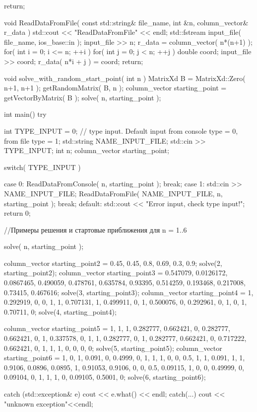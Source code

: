 \documentclass[12pt, a4paper]{extarticle}
\begin{document}
\begin{listing}[1]{1}
{	return;
}

void ReadDataFromFile( const std::string& file_name,
int &n,
column_vector& r_data )
{
	std::cout << "ReadDataFromFile" << endl;
	std::fstream input_file( file_name, ios_base::in );
	input_file >> n;
	r_data = column_vector( n*(n+1) );
	for( int i = 0; i <= n; ++i )
	{
		for( int j = 0; j < n; ++j )
		{
			double coord;
			input_file >> coord;
			r_data( n*i + j ) = coord;
		}
	}
	return;
}

void solve_with_random_start_point( int n )
{
	MatrixXd B = MatrixXd::Zero( n+1, n+1 );
	getRandomMatrix( B, n );
	column_vector starting_point = getVectorByMatrix( B );
	solve( n, starting_point );
}

int main() try
{
	
	int TYPE_INPUT = 0;
	// type input. Default input from console type = 0, from file type = 1;
	std::string NAME_INPUT_FILE;
	std::cin >> TYPE_INPUT;
	int n;
	column_vector starting_point;
	
	switch( TYPE_INPUT )
	{
		case 0:
		ReadDataFromConsole( n, starting_point );
		break;
		case 1:
		std::cin >> NAME_INPUT_FILE;
		ReadDataFromFile( NAME_INPUT_FILE, n, starting_point );
		break;
		default:
		std::cout << "Error input, check type input!";
		return 0;
		
	}
	
	//Примеры решения и стартовые приближения для n = 1..6
	
	solve( n, starting_point );
	
	column_vector starting_point2 = {0.45, 0.45,
		0.8, 0.69,
		0.3, 0.9};
	solve(2, starting_point2);
	column_vector starting_point3 = {0.547079, 0.0126172, 0.0867465,
		0.490059, 0.478761,  0.635784,
		0.93395, 0.514259, 0.193468,
		0.217008, 0.73415, 0.467616};
	solve(3, starting_point3);
	column_vector starting_point4 = {1, 0.292919, 0, 0,
		1, 1, 0.707131, 1,
		0.499911, 0, 1, 0.500076,
		0, 0.292961, 0, 1,
		0, 1, 0.70711, 0};
	solve(4, starting_point4);
	
	column_vector starting_point5 = {1, 1, 1, 0.282777, 0.662421,
		0, 0.282777, 0.662421, 0, 1,
		0.337578, 0, 1, 1, 0.282777,
		0, 1, 0.282777, 0.662421, 0,
		0.717222, 0.662421, 0, 1, 1,
		1, 0, 0, 0, 0};
	solve(5, starting_point5);
	column_vector starting_point6 = {1, 0, 1, 0.091, 0, 0.4999,
		0, 1, 1, 1, 0, 0,
		0.5, 1, 1, 0.091, 1, 1,
		0.9106, 0.0896, 0.0895, 1, 0.91053, 0.9106,
		0, 0, 0.5, 0.09115, 1, 0,
		0, 0.49999, 0, 0.09104, 0, 1,
		1, 1, 0, 0.09105, 0.5001, 0};
	solve(6, starting_point6);
	
	
}
catch (std::exception& e)
{
	cout << e.what() << endl;
}
catch(...)
{
	cout << "unknown exception"<<endl;
}
\end{listing}
\end{document}
